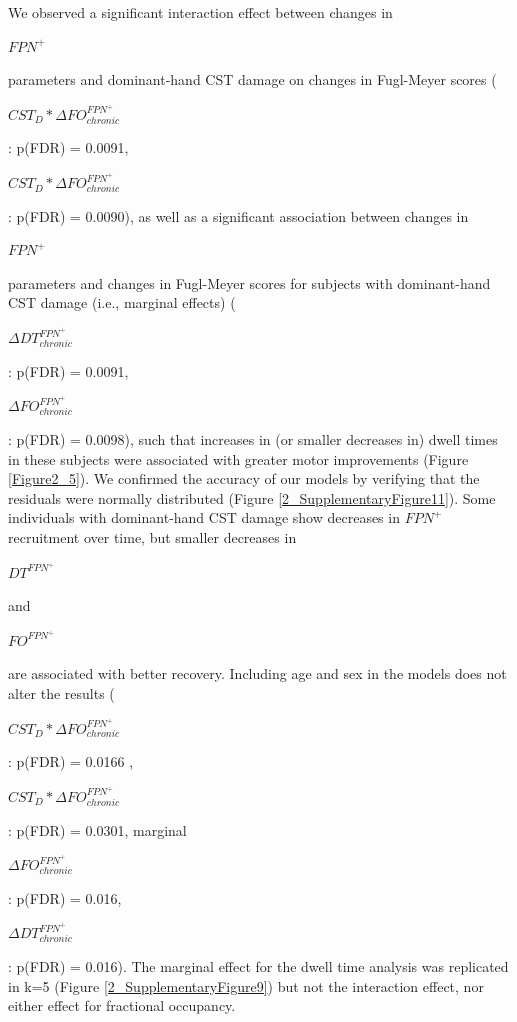 \documentclass[phd,tocprelim]{cornell}
\begin{document}
    We observed a significant interaction effect between changes in \begin{Large}$FPN^+$\end{Large} parameters and dominant-hand CST damage on changes in Fugl-Meyer scores (\begin{Large}$CST_D *\Delta FO^{FPN^+}_{chronic}$\end{Large}:  p(FDR) = 0.0091, \begin{Large}$CST_D *\Delta FO^{FPN^+}_{chronic}$\end{Large}: p(FDR) = 0.0090), as well as a significant association between changes in \begin{Large}$FPN^+$\end{Large} parameters and changes in Fugl-Meyer scores for subjects with dominant-hand CST damage (i.e., marginal effects) (\begin{Large}$\Delta DT^{FPN^+}_{chronic}$\end{Large}: p(FDR) = 0.0091,  \begin{Large}$\Delta FO^{FPN^+}_{chronic}$\end{Large}: p(FDR) = 0.0098), such that increases in (or smaller decreases in) dwell times in these subjects were associated with greater motor improvements (Figure \ref{Figure2_5}). We confirmed the accuracy of our models by verifying that the residuals were normally distributed (Figure \ref{2_SupplementaryFigure11}). Some individuals with dominant-hand CST damage show decreases in $FPN^+$ recruitment over time, but smaller decreases in \begin{Large}$DT^{FPN^+}$\end{Large} and \begin{Large}$FO^{FPN^+}$\end{Large} are associated with better recovery. Including age and sex in the models does not alter the results (\begin{Large}$CST_D *\Delta FO^{FPN^+}_{chronic}$\end{Large}:  p(FDR) = 0.0166 , \begin{Large}$CST_D *\Delta FO^{FPN^+}_{chronic}$\end{Large}: p(FDR) = 0.0301, marginal \begin{Large}$\Delta FO^{FPN^+}_{chronic}$\end{Large}: p(FDR) = 0.016, \begin{Large}$\Delta DT^{FPN^+}_{chronic}$\end{Large}: p(FDR) = 0.016). The marginal effect for the dwell time analysis was replicated in k=5 (Figure \ref{2_SupplementaryFigure9}) but not the interaction effect, nor either effect for fractional occupancy. 
    
\end{document}
